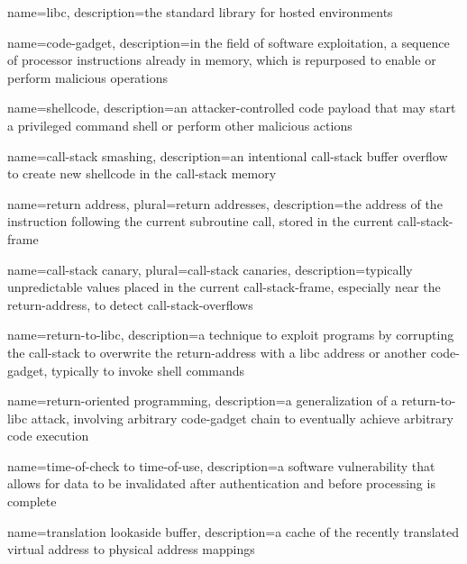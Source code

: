 {
  name={libc},
  description={the  standard library for hosted environments}
}

{
  name={code-gadget},
  description={in the field of software exploitation, a sequence of processor instructions already in memory, which is repurposed to enable or perform malicious operations}
}

{
  name={shellcode},
  description={an attacker-controlled code payload that may start a privileged command shell or perform other malicious actions}
}

{
  name={\gls{call-stack} smashing},
  description={an intentional \gls{call-stack} buffer overflow to create new \gls{shellcode} in the \gls{call-stack} memory}
}

{
  name={return address},
  plural={return addresses},
  description={the address of the instruction following the current subroutine call, stored in the current \gls{call-stack-frame}}
}

{
  name={\gls{call-stack} canary},
  plural={\gls{call-stack} canaries},
  description={typically unpredictable values placed in the current \gls{call-stack-frame}, especially near the \gls{return-address}, to detect \glspl{call-stack-overflow}}
}

{
  name={return-to-libc},
  description={a technique to exploit programs by corrupting the \gls{call-stack} to overwrite the \gls{return-address} with a \gls{libc} address or another \gls{code-gadget}, typically to invoke shell commands}
}

{
  name={return-oriented programming},
  description={a generalization of a \gls{return-to-libc} attack, involving arbitrary \gls{code-gadget} chain to eventually achieve arbitrary code execution}
}

{
  name={time-of-check to time-of-use},
  description={a software vulnerability that allows for data to be invalidated after authentication and before processing is complete}
}

{
  name={translation lookaside buffer},
  description={a cache of the recently translated virtual address to physical address mappings}
}

